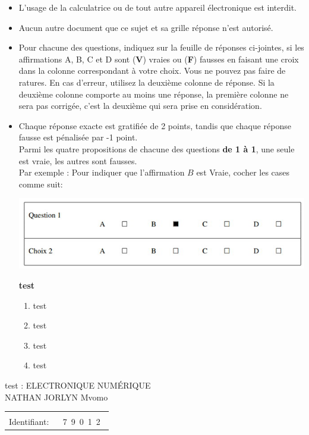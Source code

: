 \documentclass{book}%
\begin{document}
\begin{itemize}%
\item%
L'usage de la calculatrice ou de tout autre appareil électronique est interdit.%
\item%
Aucun autre document que ce sujet et sa grille réponse n'est autorisé.%
\item%
Pour chacune des questions, indiquez sur la feuille de réponses ci-jointes, si les affirmations A, B, C et D sont (\textbf{V}) vraies ou (\textbf{F}) fausses en faisant une croix dans la colonne correspondant à votre choix. Vous ne pouvez pas faire de ratures. En cas d'erreur, utilisez la deuxième colonne de réponse. Si la deuxième colonne comporte au moins une réponse, la première colonne ne sera pas corrigée, c'est la deuxième qui sera prise en considération.%
\item%
Chaque réponse exacte est gratifiée de 2 points, tandis que chaque réponse fausse est pénalisée par -1 point. \\ 	Parmi les quatre propositions de chacune des questions \textbf{de 1 à 1}, une seule est vraie, les autres sont fausses. \\ 	Par exemple : Pour indiquer que l'affirmation $B$ est Vraie, cocher les cases comme suit:  \\ \begin{center}	\includegraphics[scale=0.8]{reponses.png} \end{center}%
\thispagestyle{empty}%
\begin{exercise}%
\textbf{test }%
\begin{enumerate}[label=\textbf{\Alph*. }]%
\item%
test%
\item%
test%
\item%
test%
\item%
test%
\end{enumerate}%
\end{exercise}%
\end{itemize}%
\newpage%
\thispagestyle{empty}%
test : ELECTRONIQUE NUMÉRIQUE $\qquad \qquad \qquad \qquad \qquad \qquad \qquad \qquad$ NATHAN JORLYN Mvomo%
\begin{flushright}%
\begin{tabular}{|l|}%
\hline%
 \\%
\thispagestyle{empty}%
Identifiant: $\quad$ {\Large 7~9~0~1~2~}%
 \\%
\hline%
\end{tabular}%
\end{flushright}%
\end{document}
